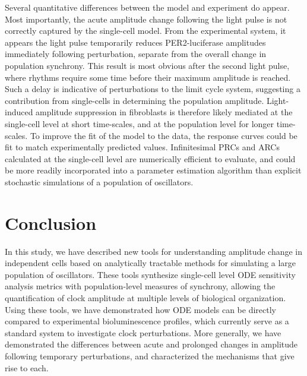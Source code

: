 \documentclass[11pt, letterpaper]{article}
\providecommand{\DIFadd}[1]{{\protect\color{blue}#1}} %
\providecommand{\DIFdel}[1]{{\protect\color{red}}}                      %
\providecommand{\DIFaddbegin}{} %
\providecommand{\DIFaddend}{} %
\providecommand{\DIFdelbegin}{} %
\providecommand{\DIFdelend}{} %
\begin{document}
\DIFdelbegin \DIFdel{Some }\DIFdelend \DIFaddbegin \DIFadd{Several }\DIFaddend quantitative differences between the model and experiment do appear\DIFdelbegin \DIFdel{, most
importantly}\DIFdelend \DIFaddbegin \DIFadd{.
Most importantly, }\DIFaddend the acute amplitude change following the light pulse \DIFaddbegin \DIFadd{is not correctly captured by the single-cell model}\DIFaddend .
From the experimental system, it appears the light pulse temporarily reduces PER2-luciferase amplitudes immediately following perturbation, separate from the overall change in population synchrony.
\DIFdelbegin \DIFdel{Such a change }\DIFdelend \DIFaddbegin \DIFadd{This result is most obvious after the second light pulse, where rhythms require some time before their maximum amplitude is reached.
Such a delay }\DIFaddend is indicative of perturbations to the \DIFdelbegin \DIFdel{limit-cycle systemand suggests }\DIFdelend \DIFaddbegin \DIFadd{limit cycle system, suggesting }\DIFaddend a contribution from single-cells in determining the population amplitude.
\DIFaddbegin \DIFadd{Light-induced amplitude suppression in fibroblasts is therefore likely mediated at the single-cell level at short time-scales, and at the population level for longer time-scales.
To improve the fit of the model to the data, the response curves could be fit to match experimentally predicted values.
Infinitesimal PRCs and ARCs calculated at the single-cell level are numerically efficient to evaluate, and could be more readily incorporated into a parameter estimation algorithm than explicit stochastic simulations of a population of oscillators.
}\DIFaddend 

\section*{Conclusion}

In this study, we have described new tools for understanding amplitude change in \DIFdelbegin \DIFdel{weakly coupled }\DIFdelend \DIFaddbegin \DIFadd{independent }\DIFaddend cells based on analytically tractable methods for simulating a large population of oscillators.
These tools synthesize single-cell level ODE sensitivity analysis metrics with population-level measures of synchrony, allowing the quantification of clock amplitude at \DIFdelbegin \DIFdel{all }\DIFdelend \DIFaddbegin \DIFadd{multiple }\DIFaddend levels of biological organization.
Using these tools, we have demonstrated how ODE models can be directly compared to experimental bioluminescence profiles, which currently serve as a standard system to investigate clock perturbations.
More generally, we have demonstrated the differences between acute and prolonged changes in amplitude following temporary perturbations, and characterized the mechanisms \DIFdelbegin \DIFdel{which }\DIFdelend \DIFaddbegin \DIFadd{that }\DIFaddend give rise to each.
\end{document}
